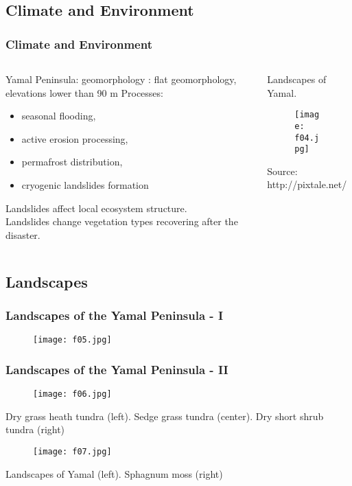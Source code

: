 \documentclass[pdflatex,compress,8pt,
	xcolor={dvipsnames,dvipsnames,svgnames,x11names,table},
	hyperref={colorlinks = true,
	breaklinks = true, 
	urlcolor = NavyBlue, 
	breaklinks = true}]{beamer}
\begin{document}
\subsection{Climate and Environment}
\begin{frame}\frametitle{Climate and Environment}
\begin{minipage}[0.4\textheight]{\textwidth}
\begin{columns}[T]
\begin{column}{0.5\textwidth}
Yamal Peninsula: geomorphology : flat geomorphology, elevations lower than 90 m
Processes:
 \begin{itemize}
        	\item seasonal flooding,
	\item active erosion processing,
	\item permafrost distribution,
	\item cryogenic landslides formation
\end{itemize}
Landslides affect local ecosystem structure. \\
Landslides change vegetation types recovering after the disaster.
\end{column}
\begin{column}{0.5\textwidth}
Landscapes of Yamal. 
\begin{figure}[H]
	\centering
		\texttt{[image: f04.jpg]}
\end{figure}
Source: http://pixtale.net/
\end{column}
\end{columns}
\end{minipage}
\end{frame}

\subsection{Landscapes}
\begin{frame}\frametitle{Landscapes of the Yamal Peninsula - I}
\begin{figure}[H]
	\centering
		\texttt{[image: f05.jpg]}
\end{figure}
\end{frame}

\begin{frame}\frametitle{Landscapes of the Yamal Peninsula - II}
\begin{figure}[H]
	\centering
		\texttt{[image: f06.jpg]}
\end{figure}
Dry grass heath tundra (left). Sedge grass tundra (center). Dry short shrub tundra (right)
\begin{figure}[H]
	\centering
		\texttt{[image: f07.jpg]}
\end{figure}
Landscapes of Yamal (left). Sphagnum moss (right)
\end{frame}
\end{document}
